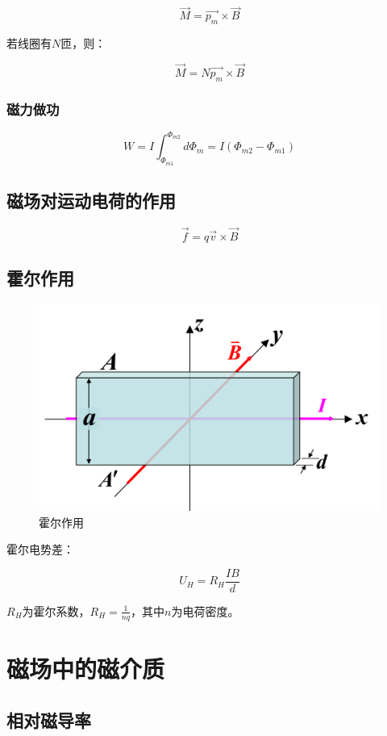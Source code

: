 \documentclass{ctexart}
\begin{document}
$$\vec{M}=\vec{p_m}\times \vec{B}$$

若线圈有$N$匝，则：

$$\vec{M}=N\vec{p_m}\times \vec{B}$$

\subsubsection{磁力做功}

$$W=I\int_{\Phi_{m1}}^{\Phi_{m2}}d\Phi_m=I(\Phi_{m2}-\Phi_{m1})$$

\subsection{磁场对运动电荷的作用}

$$\vec{f}=q\vec{v}\times \vec{B}$$

\subsection{霍尔作用}

\begin{figure}[h]
	\centering
	\includegraphics[scale=0.4]{images//chapter_12//figure_12.5.jpg} 
	\caption{霍尔作用}\label{figure12.5}
\end{figure}

霍尔电势差：

$$U_H=R_H\frac{IB}{d}$$

$R_H$为霍尔系数，$R_H=\frac{1}{nq}$，其中$n$为电荷密度。

\section{磁场中的磁介质}

\subsection{相对磁导率}
\end{document}
